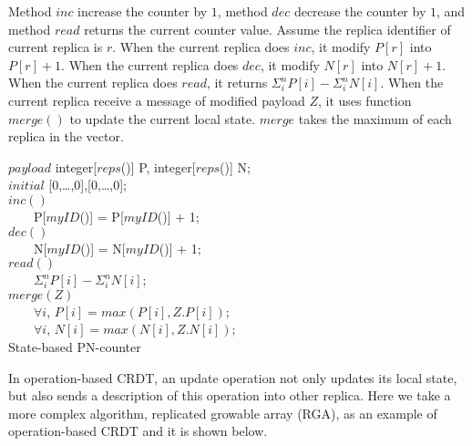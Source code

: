 Method $\mathit{inc}$ increase the counter by $1$, method $\mathit{dec}$ decrease the counter by $1$, and method $\mathit{read}$ returns the current counter value. Assume the replica identifier of current replica is $r$. When the current replica does $\mathit{inc}$, it modify $P[r]$ into $P[r]+1$. When the current replica does $\mathit{dec}$, it modify $N[r]$ into $N[r]+1$. When the current replica does $\mathit{read}$, it returns $\Sigma_{i}^{n} P[i] - \Sigma_{i}^{n} N[i]$. When the current replica receive a message of modified payload $Z$, it uses function $\mathit{merge}()$ to update the current local state. $\mathit{merge}$ takes the maximum of each replica in the vector.

\renewcommand{\algorithmcfname}{CRDT Implementation}
\noindent
\noindent\begin{algorithm}[H]
$\mathit{payload}$ integer[$\mathit{reps}$()] P, integer[$\mathit{reps}$()] N; \\
$\mathit{initial}$ [0,\ldots,0],[0,\ldots,0]; \\

$\mathit{inc}()$ \\
\ \ \ \ P[$\mathit{myID}$()] = P[$\mathit{myID}$()] + 1; \\

$\mathit{dec}()$ \\
\ \ \ \ N[$\mathit{myID}$()] = N[$\mathit{myID}$()] + 1; \\

$\mathit{read}()$ \\
\ \ \ \ \KwRet $\Sigma_{i}^{n} P[i] - \Sigma_{i}^{n} N[i]$; \\

$\mathit{merge}(Z)$ \\
\ \ \ \ $\forall i$, $P[i] = \mathit{max}(P[i],Z.P[i])$; \\
\ \ \ \ $\forall i$, $N[i] = \mathit{max}(N[i],Z.N[i])$; \\
\caption{State-based PN-counter}
\label{Method1}
\end{algorithm}

In operation-based CRDT, an update operation not only updates its local state, but also sends a description of this operation into other replica. Here we take a more complex algorithm, replicated growable array (RGA), as an example of operation-based CRDT and it is shown below.

